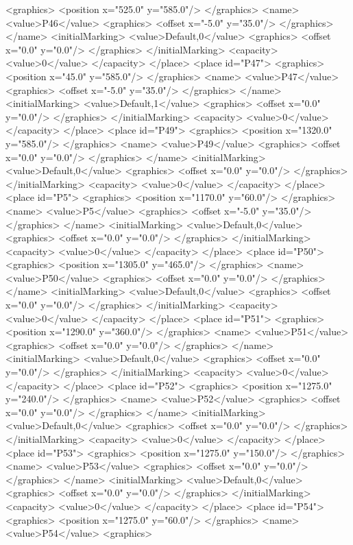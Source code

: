 <graphics>
<position x="525.0" y="585.0"/>
</graphics>
<name>
<value>P46</value>
<graphics>
<offset x="-5.0" y="35.0"/>
</graphics>
</name>
<initialMarking>
<value>Default,0</value>
<graphics>
<offset x="0.0" y="0.0"/>
</graphics>
</initialMarking>
<capacity>
<value>0</value>
</capacity>
</place>
<place id="P47">
<graphics>
<position x="45.0" y="585.0"/>
</graphics>
<name>
<value>P47</value>
<graphics>
<offset x="-5.0" y="35.0"/>
</graphics>
</name>
<initialMarking>
<value>Default,1</value>
<graphics>
<offset x="0.0" y="0.0"/>
</graphics>
</initialMarking>
<capacity>
<value>0</value>
</capacity>
</place>
<place id="P49">
<graphics>
<position x="1320.0" y="585.0"/>
</graphics>
<name>
<value>P49</value>
<graphics>
<offset x="0.0" y="0.0"/>
</graphics>
</name>
<initialMarking>
<value>Default,0</value>
<graphics>
<offset x="0.0" y="0.0"/>
</graphics>
</initialMarking>
<capacity>
<value>0</value>
</capacity>
</place>
<place id="P5">
<graphics>
<position x="1170.0" y="60.0"/>
</graphics>
<name>
<value>P5</value>
<graphics>
<offset x="-5.0" y="35.0"/>
</graphics>
</name>
<initialMarking>
<value>Default,0</value>
<graphics>
<offset x="0.0" y="0.0"/>
</graphics>
</initialMarking>
<capacity>
<value>0</value>
</capacity>
</place>
<place id="P50">
<graphics>
<position x="1305.0" y="465.0"/>
</graphics>
<name>
<value>P50</value>
<graphics>
<offset x="0.0" y="0.0"/>
</graphics>
</name>
<initialMarking>
<value>Default,0</value>
<graphics>
<offset x="0.0" y="0.0"/>
</graphics>
</initialMarking>
<capacity>
<value>0</value>
</capacity>
</place>
<place id="P51">
<graphics>
<position x="1290.0" y="360.0"/>
</graphics>
<name>
<value>P51</value>
<graphics>
<offset x="0.0" y="0.0"/>
</graphics>
</name>
<initialMarking>
<value>Default,0</value>
<graphics>
<offset x="0.0" y="0.0"/>
</graphics>
</initialMarking>
<capacity>
<value>0</value>
</capacity>
</place>
<place id="P52">
<graphics>
<position x="1275.0" y="240.0"/>
</graphics>
<name>
<value>P52</value>
<graphics>
<offset x="0.0" y="0.0"/>
</graphics>
</name>
<initialMarking>
<value>Default,0</value>
<graphics>
<offset x="0.0" y="0.0"/>
</graphics>
</initialMarking>
<capacity>
<value>0</value>
</capacity>
</place>
<place id="P53">
<graphics>
<position x="1275.0" y="150.0"/>
</graphics>
<name>
<value>P53</value>
<graphics>
<offset x="0.0" y="0.0"/>
</graphics>
</name>
<initialMarking>
<value>Default,0</value>
<graphics>
<offset x="0.0" y="0.0"/>
</graphics>
</initialMarking>
<capacity>
<value>0</value>
</capacity>
</place>
<place id="P54">
<graphics>
<position x="1275.0" y="60.0"/>
</graphics>
<name>
<value>P54</value>
<graphics>
